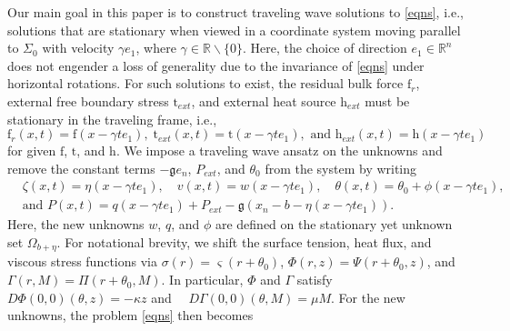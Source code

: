 \documentclass[11pt,letterpaper,reqno]{amsart}
\numberwithin{equation}{section}
\begin{document}
Our main goal in this paper is to construct traveling wave solutions to \eqref{eqns}, i.e., solutions that are stationary when viewed in a coordinate system moving parallel to $\Sigma_0$ with velocity $\gamma e_1$, where $\gamma \in \mathbb{R} \backslash \{0\}$. Here, the choice of direction $e_1 \in \mathbb{R}^n$ does not engender a loss of generality due to the invariance of \eqref{eqns} under horizontal rotations. For such solutions to exist, the residual bulk force \(\mathrm{f}_{r}\), external free boundary stress \(\mathrm{t}_{ext}\), and external heat source \(\mathrm{h}_{ext}\) must be stationary in the traveling frame, i.e.,
\begin{equation}
    \mathrm{f}_{r}(x,t) = \mathrm{f}(x- \gamma t e_1),  \; \mathrm{t}_{ext}(x,t)  = \mathrm{t}(x- \gamma t e_1), \text{ and }\mathrm{h}_{ext}(x,t) = \mathrm{h}(x- \gamma t e_1)
\end{equation}
for given $\mathrm{f}$, $\mathrm{t}$, and $\mathrm{h}$. We impose a traveling wave ansatz on the unknowns and remove the constant terms $-\mathfrak{g} e_n$, $P_{ext}$, and $\theta_0$ from the system by writing 
\begin{align}
 &\zeta(x,t) = \eta(x-\gamma t e_1), \quad v(x,t) = w(x-\gamma t e_1), \quad \theta(x,t) = \theta_0 + \phi(x-\gamma t e_1), \nonumber \\
 &\text{and }P(x,t) = q(x-\gamma t e_1) +P_{ext} - \mathfrak{g}(x_n-b-\eta(x-\gamma t e_1)).
\end{align}
Here, the new unknowns \(w\), \(q\), and \(\phi\) are defined on the stationary yet unknown set $\Omega_{b+\eta}$. For notational brevity, we shift the surface tension, heat flux, and viscous stress functions via \(\sigma(r)=\varsigma(r+\theta_0)\), \(\Phi(r,z)=\Psi(r+\theta_0,z)\), and \(\Gamma(r,M)=\Pi(r+\theta_0,M)\). In particular, \(\Phi\) and \(\Gamma\) satisfy  $D \Phi(0,0)(\theta,z) = -\kappa z$ and $\quad D \Gamma(0,0)(\theta,M) = \mu M$. For the new unknowns, the problem \eqref{eqns} then becomes
\end{document}
